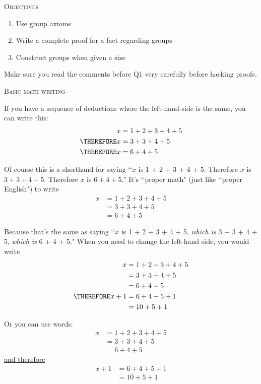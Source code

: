 



\renewcommand\AUTHOR{John Doe}
\renewcommand\EMAIL{jdoe@gmail.com}
\renewcommand\TITLE{Assignment 4}

\renewcommand{\thethm}{\arabic{thm}}%


\topmatter

\textsc{Objectives}
\begin{enumerate}[nosep]
\item Use group axioms
\item Write a complete proof for a fact regarding groups
\item Construct groups when given a size 
\end{enumerate}

Make sure you read the comments before Q1 very carefully
before hacking proofs.

\newpage
\textsc{Basic math writing}

If you have a sequence of deductions where the left-hand-side is the same,
you can write this:
\begin{align*}
x &= 1 + 2 + 3 + 4 + 5 \\
\THEREFORE x &= 3 + 3 + 4 + 5 \\
\THEREFORE x &= 6 + 4 + 5
\end{align*}

Of course this is a shorthand for saying
\lq\lq $x$ is 1 + 2 + 3 + 4 + 5.
Therefore $x$ is $3 + 3 + 4 + 5$.
Therefore $x$ is $6 + 4 + 5$."
It's \lq\lq proper math" (just like \lq\lq proper English") to write
\begin{align*}
x &= 1 + 2 + 3 + 4 + 5 \\
&= 3 + 3 + 4 + 5 \\
&= 6 + 4 + 5 
\end{align*}

Because that's the same as saying
\lq\lq $x$ is 1 + 2 + 3 + 4 + 5, \textit{which is} 3 + 3 + 4 + 5,
\textit{which is} 6 + 4 + 5."
When you need to change the left-hand side,
you would write
\begin{align*}
x &= 1 + 2 + 3 + 4 + 5 \\
&= 3 + 3 + 4 + 5 \\
&= 6 + 4 + 5 \\
\THEREFORE x + 1
&= 6 + 4 + 5 + 1\\
&= 10 + 5 + 1
\end{align*}

Or you can use words:
\begin{align*}
x &= 1 + 2 + 3 + 4 + 5 \\
&= 3 + 3 + 4 + 5 \\
&= 6 + 4 + 5
\end{align*}
\underline{and therefore}
\begin{align*}
x + 1
&= 6 + 4 + 5 + 1\\
&= 10 + 5 + 1
\end{align*}

